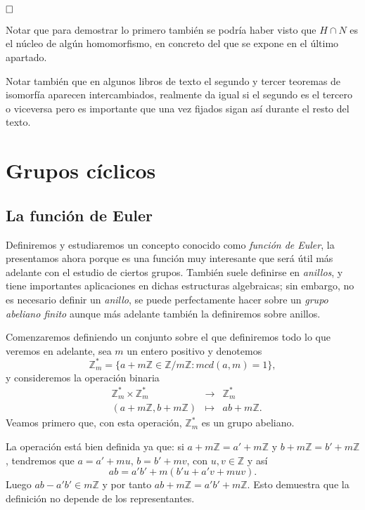\documentclass[12pt]{article}
\begin{document}
$\hfill \square$

Notar que para demostrar lo primero también se podría haber visto que $H \cap N$ es el núcleo de algún homomorfismo, en concreto del que se expone en el último apartado.

Notar también que en algunos libros de texto el segundo y tercer teoremas de isomorfía aparecen intercambiados, realmente da igual si el segundo es el tercero o viceversa pero es importante que una vez fijados sigan así durante el resto del texto.

\section{Grupos cíclicos}
\subsection{La función de Euler}

Definiremos y estudiaremos un concepto conocido como \textit{función de Euler}, la presentamos ahora porque es una función muy interesante que será útil más adelante con el estudio de ciertos grupos. También suele definirse en \textit{anillos}, y tiene importantes aplicaciones en dichas estructuras algebraicas; sin embargo, no es necesario definir un \textit{anillo}, se puede perfectamente hacer sobre un \textit{grupo abeliano finito} aunque más adelante también la definiremos sobre anillos.

Comenzaremos definiendo un conjunto sobre el que definiremos todo lo que veremos en adelante, sea $m$ un entero positivo y denotemos 
$$\mathbb{Z}_{m}^{\ast} = \lbrace a +m\mathbb{Z} \in \mathbb{Z} / m\mathbb{Z} : mcd(a,m)= 1 \rbrace,$$
y consideremos la operación binaria $$\begin{array}{rccl}
&\mathbb{Z}_{m}^{\ast} \times \mathbb{Z}_{m}^{\ast} & \longrightarrow & \mathbb{Z}_{m}^{\ast}\\
&(a+m\mathbb{Z},b+m\mathbb{Z})& \longmapsto &ab+m\mathbb{Z}.
\end{array}
$$
Veamos primero que, con esta operación, $\mathbb{Z}_{m}^{\ast}$ es un grupo abeliano.

La operación está bien definida ya que: si $a + m\mathbb{Z} = a' + m\mathbb{Z}$ y $b + m\mathbb{Z} = b' + m\mathbb{Z}$, tendremos que $a = a' + mu$, $b = b' + mv$, con $u,v \in \mathbb{Z}$ y así $$ab = a'b' + m(b'u + a'v + muv).$$ Luego $ab - a'b' \in m\mathbb{Z}$ y por tanto $ab + m\mathbb{Z} = a'b' + m\mathbb{Z}.$ Esto demuestra que la definición no depende de los representantes.
\end{document}
